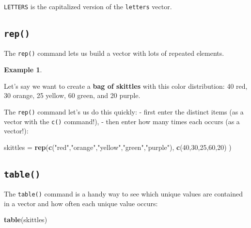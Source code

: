 \documentclass[
]{book}
\newenvironment{Shaded}{\begin{snugshade}}{\end{snugshade}}
\newcommand{\DecValTok}[1]{\textcolor[rgb]{0.00,0.00,0.81}{#1}}
\newcommand{\FunctionTok}[1]{\textcolor[rgb]{0.13,0.29,0.53}{\textbf{#1}}}
\newcommand{\NormalTok}[1]{#1}
\newcommand{\OtherTok}[1]{\textcolor[rgb]{0.56,0.35,0.01}{#1}}
\newcommand{\StringTok}[1]{\textcolor[rgb]{0.31,0.60,0.02}{#1}}
\theoremstyle{definition}
\theoremstyle{definition}
\newtheorem{example}{Example}[chapter]
\theoremstyle{definition}
\theoremstyle{definition}
\theoremstyle{remark}
\begin{document}
\texttt{LETTERS} is the capitalized version of the \texttt{letters} vector.

\subsection{\texorpdfstring{\texttt{rep()}}{rep()}}\label{rep}

The \texttt{rep()} command lets us build a vector with lots of repeated elements.

\begin{example}
\protect\hypertarget{exm:skittles}{}\label{exm:skittles}

Let's say we want to create a \textbf{bag of skittles} with this color distribution: 40 red, 30 orange, 25 yellow, 60 green, and 20 purple.

The \texttt{rep()} command let's us do this quickly:
- first enter the distinct items (as a vector with the \texttt{c()} command!),
- then enter how many times each occurs (as a vector!):

\begin{Shaded}
\begin{Highlighting}[]
\NormalTok{skittles }\OtherTok{=} \FunctionTok{rep}\NormalTok{(}\FunctionTok{c}\NormalTok{(}\StringTok{"red"}\NormalTok{,}\StringTok{"orange"}\NormalTok{,}\StringTok{"yellow"}\NormalTok{,}\StringTok{"green"}\NormalTok{,}\StringTok{"purple"}\NormalTok{),}
               \FunctionTok{c}\NormalTok{(}\DecValTok{40}\NormalTok{,}\DecValTok{30}\NormalTok{,}\DecValTok{25}\NormalTok{,}\DecValTok{60}\NormalTok{,}\DecValTok{20}\NormalTok{)}
\NormalTok{               )}
\end{Highlighting}
\end{Shaded}

\end{example}

\subsection{\texorpdfstring{\texttt{table()}}{table()}}\label{table}

The \texttt{table()} command is a handy way to see which unique values are contained in a vector and how often each unique value occurs:

\begin{Shaded}
\begin{Highlighting}[]
\FunctionTok{table}\NormalTok{(skittles)}
\end{Highlighting}
\end{Shaded}
\end{document}

